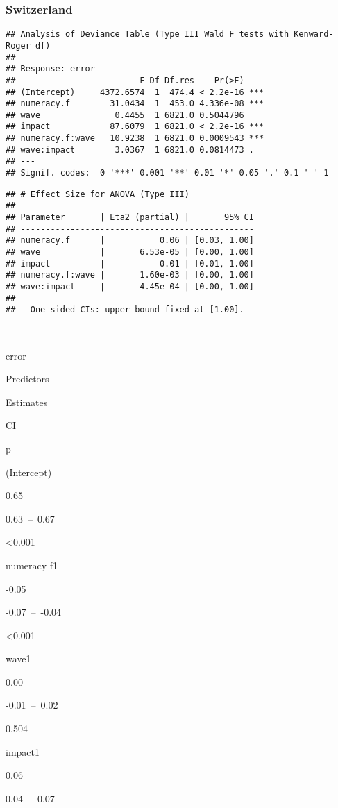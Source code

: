 \documentclass[
]{article}
\begin{document}
\hypertarget{switzerland}{%
\subsubsection{Switzerland}\label{switzerland}}

\begin{verbatim}
## Analysis of Deviance Table (Type III Wald F tests with Kenward-Roger df)
## 
## Response: error
##                         F Df Df.res    Pr(>F)    
## (Intercept)     4372.6574  1  474.4 < 2.2e-16 ***
## numeracy.f        31.0434  1  453.0 4.336e-08 ***
## wave               0.4455  1 6821.0 0.5044796    
## impact            87.6079  1 6821.0 < 2.2e-16 ***
## numeracy.f:wave   10.9238  1 6821.0 0.0009543 ***
## wave:impact        3.0367  1 6821.0 0.0814473 .  
## ---
## Signif. codes:  0 '***' 0.001 '**' 0.01 '*' 0.05 '.' 0.1 ' ' 1
\end{verbatim}

\begin{verbatim}
## # Effect Size for ANOVA (Type III)
## 
## Parameter       | Eta2 (partial) |       95% CI
## -----------------------------------------------
## numeracy.f      |           0.06 | [0.03, 1.00]
## wave            |       6.53e-05 | [0.00, 1.00]
## impact          |           0.01 | [0.01, 1.00]
## numeracy.f:wave |       1.60e-03 | [0.00, 1.00]
## wave:impact     |       4.45e-04 | [0.00, 1.00]
## 
## - One-sided CIs: upper bound fixed at [1.00].
\end{verbatim}

~

error

Predictors

Estimates

CI

p

(Intercept)

0.65

0.63~--~0.67

\textless0.001

numeracy f1

-0.05

-0.07~--~-0.04

\textless0.001

wave1

0.00

-0.01~--~0.02

0.504

impact1

0.06

0.04~--~0.07
\end{document}
